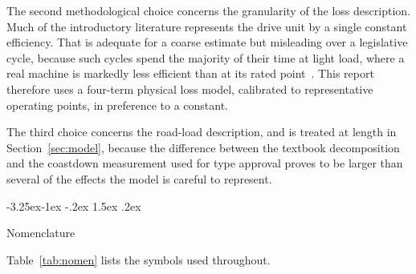 \documentclass[twocolumn]{article}
\makeatletter
\renewcommand\subsection{\@startsection{subsection}{2}{\z@}%
  {-3.25ex\@plus -1ex \@minus -.2ex}%
  {1.5ex \@plus .2ex}%
  {\raggedright\normalfont\large\bfseries}}
\makeatother
\begin{document}
The second methodological choice concerns the granularity of the loss
description. Much of the introductory literature represents the drive unit by a
single constant efficiency. That is adequate for a coarse estimate but
misleading over a legislative cycle, because such cycles spend the majority of
their time at light load, where a real machine is markedly less efficient than
at its rated point~\cite{sarlioglu2017}. This report therefore uses a
four-term physical loss model, calibrated to representative operating points,
in preference to a constant.

The third choice concerns the road-load description, and is treated at length
in Section~\ref{sec:model}, because the difference between the textbook
decomposition and the coastdown measurement used for type approval proves to be
larger than several of the effects the model is careful to represent.

\subsection{Nomenclature}

Table~\ref{tab:nomen} lists the symbols used throughout.
\end{document}
